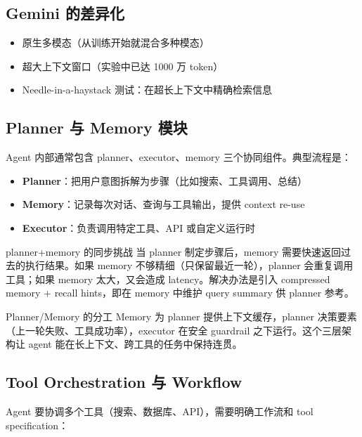\documentclass[a4paper]{article}
\begin{document}
\subsection{Gemini 的差异化}

\begin{itemize}
    \item 原生多模态（从训练开始就混合多种模态）
    \item 超大上下文窗口（实验中已达 1000 万 token）
    \item Needle-in-a-haystack 测试：在超长上下文中精确检索信息
\end{itemize}

\subsection{Planner 与 Memory 模块}

Agent 内部通常包含 planner、executor、memory 三个协同组件。典型流程是：

\begin{itemize}
    \item \textbf{Planner}：把用户意图拆解为步骤（比如搜索、工具调用、总结）
    \item \textbf{Memory}：记录每次对话、查询与工具输出，提供 context re-use
    \item \textbf{Executor}：负责调用特定工具、API 或自定义运行时
\end{itemize}

\begin{importantbox}{planner+memory 的同步挑战}
当 planner 制定步骤后，memory 需要快速返回过去的执行结果。如果 memory 不够精细（只保留最近一轮），planner 会重复调用工具；如果 memory 太大，又会造成 latency。解决办法是引入 compressed memory + recall hints，即在 memory 中维护 query summary 供 planner 参考。
\end{importantbox}
\begin{importantbox}{Planner/Memory 的分工}
Memory 为 planner 提供上下文缓存，planner 决策要素（上一轮失败、工具成功率），executor 在安全 guardrail 之下运行。这个三层架构让 agent 能在长上下文、跨工具的任务中保持连贯。
\end{importantbox}

\subsection{Tool Orchestration 与 Workflow}

Agent 要协调多个工具（搜索、数据库、API），需要明确工作流和 tool specification：
\end{document}
